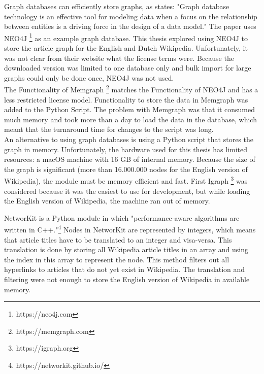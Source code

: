 Graph databases can efficiently store graphs, as \citep{neo4j} states: "Graph database technology is an effective tool for modeling data when a focus on the relationship between entities is a driving force in the design of a data model." The paper uses NEO4J \footnote{https://neo4j.com} as an example graph database. This thesis explored using NEO4J to store the article graph for the English and Dutch Wikipedia. Unfortunately, it was not clear from their website what the license terms were. Because the downloaded version was limited to one database only and bulk import for large graphs could only be done once, NEO4J was not used. \\
The Functionality of Memgraph \footnote{https://memgraph.com} matches the Functionality of NEO4J and has a less restricted license model. Functionality to store the data in Memgraph was added to the Python Script. The problem with Memgraph was that it consumed much memory and took more than a day to load the data in the database, which meant that the turnaround time for changes to the script was long.\\

An alternative to using graph databases is using a Python script that stores the graph in memory. Unfortunately, the hardware used for this thesis has limited resources: a macOS machine with 16 GB of internal memory. Because the size of the graph is significant (more than 16.000.000 nodes for the English version of Wikipedia), the module must be memory efficient and fast. First Igraph \footnote{https://igraph.org} was considered because it was the easiest to use for development, but while loading the English version of Wikipedia, the machine ran out of memory.

NetworKit is a Python module in which "performance-aware algorithms are written in C++."\footnote{https://networkit.github.io/} Nodes in NetworKit are represented by integers, which means that article titles have to be translated to an integer and visa-versa. This translation is done by storing all Wikipedia article titles in an array and using the index in this array to represent the node. This method filters out all hyperlinks to articles that do not yet exist in Wikipedia. The translation and filtering were not enough to store the English version of Wikipedia in available memory. \\

